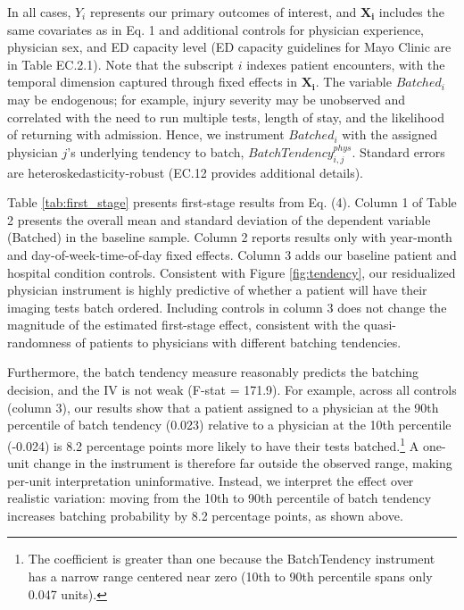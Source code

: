 \documentclass[,,blindrev]{informs}
\begin{document}
In all cases, \(Y_i\) represents our primary outcomes of interest, and
\(\mathbf{X_i}\) includes the same covariates as in Eq. 1 and additional
controls for physician experience, physician sex, and ED capacity level
(ED capacity guidelines for Mayo Clinic are in Table EC.2.1). Note that
the subscript \(i\) indexes patient encounters, with the temporal
dimension captured through fixed effects in \(\mathbf{X_i}\). The
variable \(Batched_i\) may be endogenous; for example, injury severity
may be unobserved and correlated with the need to run multiple tests,
length of stay, and the likelihood of returning with admission. Hence,
we instrument \(Batched_i\) with the assigned physician \(j\)'s
underlying tendency to batch, \(BatchTendency_{i,j}^{phys}\). Standard
errors are heteroskedasticity-robust (EC.12 provides additional
details).

Table \ref{tab:first_stage} presents first-stage results from Eq. (4).
Column 1 of Table 2 presents the overall mean and standard deviation of
the dependent variable (Batched) in the baseline sample. Column 2
reports results only with year-month and day-of-week-time-of-day fixed
effects. Column 3 adds our baseline patient and hospital condition
controls. Consistent with Figure \ref{fig:tendency}, our residualized
physician instrument is highly predictive of whether a patient will have
their imaging tests batch ordered. Including controls in column 3 does
not change the magnitude of the estimated first-stage effect, consistent
with the quasi-randomness of patients to physicians with different
batching tendencies.

Furthermore, the batch tendency measure reasonably predicts the batching
decision, and the IV is not weak (F-stat = 171.9). For example, across
all controls (column 3), our results show that a patient assigned to a
physician at the 90th percentile of batch tendency (0.023) relative to a
physician at the 10th percentile (-0.024) is 8.2 percentage points more
likely to have their tests
batched.\footnote{The coefficient is greater than one because the BatchTendency instrument has a narrow range centered near zero (10th to 90th percentile spans only 0.047 units).}
A one-unit change in the instrument is therefore far outside the
observed range, making per-unit interpretation uninformative. Instead,
we interpret the effect over realistic variation: moving from the 10th
to 90th percentile of batch tendency increases batching probability by
8.2 percentage points, as shown above.
\end{document}
